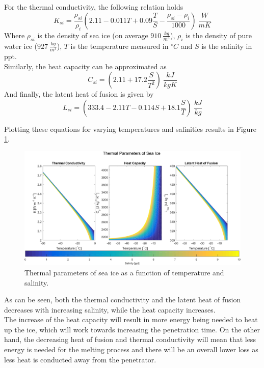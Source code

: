 \noindent
For the thermal conductivity, the following relation holds
\begin{equation}
K_{si}=\frac{\rho_{si}}{\rho_i}\left(2.11 - 0.011 T + 0.09 \frac{T}{S} - \frac{\rho_{si}-\rho_i}{1000}\right)\SI{}{\frac{W}{m K}}
\end{equation}
Where $\rho_{si}$ is the density of sea ice (on average $\SI{910}{\frac{kg}{m^3}}$\cite{article:timco19961}), $\rho_i$ is the density of pure water ice ($\SI{927}{\frac{kg}{m^3}}$), $T$ is the temperature measured in $^\circ C$ and $S$ is the salinity in ppt.\\
Similarly, the heat capacity can be approximated as
\begin{equation}
C_{si} = \left(2.11 + 17.2 \frac{S}{T^2}\right)\SI{}{\frac{kJ}{kg K}}
\end{equation}
And finally, the latent heat of fusion is given by
\begin{equation}
L_{si}=\left(333.4-2.11T-0.114S+18.1\frac{S}{T}\right)\SI{}{\frac{kJ}{kg}}
\end{equation}

\noindent
Plotting these equations for varying temperatures and salinities results in Figure \ref{fig:iceSalinity}.
\begin{figure}[ht]
	\centering
	\includegraphics[width=.9\textwidth]{figures/LAMC/salinity}
	\caption{Thermal parameters of sea ice as a function of temperature and salinity.}
	\label{fig:iceSalinity}
\end{figure}
As can be seen, both the thermal conductivity and the latent heat of fusion decreases with increasing salinity, while the heat capacity increases. \\

\noindent
The increase of the heat capacity will result in more energy being needed to heat up the ice, which will work towards increasing the penetration time. On the other hand, the decreasing heat of fusion and thermal conductivity will mean that less energy is needed for the melting process and there will be an overall lower loss as less heat is conducted away from the penetrator.\\


